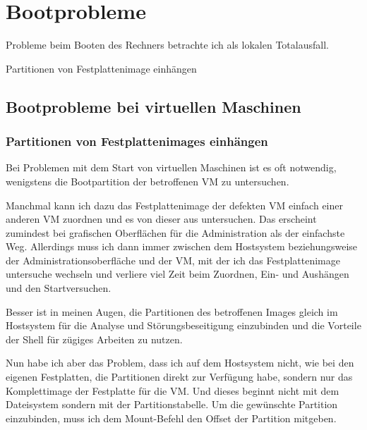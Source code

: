 \chapter{Bootprobleme}
\label{cha:bootprobleme}

\begin{abstractsec}
  Probleme beim Booten des Rechners betrachte ich als lokalen Totalausfall.
\end{abstractsec}

\begin{notes}
\item Partitionen von Festplattenimage einhängen
\end{notes}

\section{Bootprobleme bei virtuellen Maschinen}
\label{sec:lokal-bootprobleme-vm}

\subsection*{Partitionen von Festplattenimages einhängen}
\label{sec:mount-hdimage-partition}

Bei Problemen mit dem Start von virtuellen Maschinen ist es oft notwendig,
wenigstens die Bootpartition der betroffenen VM zu untersuchen.

Manchmal kann
ich dazu das Festplattenimage der defekten VM einfach einer anderen VM
zuordnen und es von dieser aus untersuchen. Das erscheint zumindest bei
grafischen Oberflächen für die Administration als der einfachste Weg.
Allerdings muss ich dann immer zwischen dem Hostsystem beziehungsweise der
Administrationsoberfläche und der VM, mit der ich das Festplattenimage
untersuche wechseln und verliere viel Zeit beim Zuordnen, Ein- und Aushängen
und den Startversuchen.

Besser ist in meinen Augen, die Partitionen des betroffenen Images gleich im
Hostsystem für die Analyse und Störungsbeseitigung einzubinden und die
Vorteile der Shell für zügiges Arbeiten zu nutzen.

Nun habe ich aber das Problem, dass ich auf dem Hostsystem nicht, wie bei den
eigenen Festplatten, die Partitionen direkt zur Verfügung habe, sondern nur
das Komplettimage der Festplatte für die VM. Und dieses beginnt nicht mit dem
Dateisystem sondern mit der Partitionstabelle. Um die gewünschte Partition
einzubinden, muss ich dem Mount-Befehl den Offset der Partition mitgeben.


